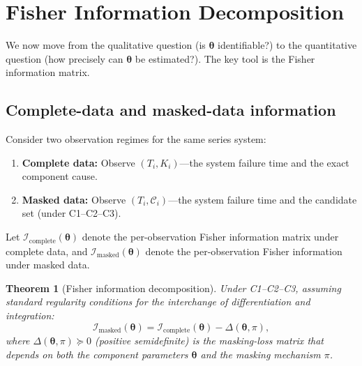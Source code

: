 \documentclass[11pt]{article}
\theoremstyle{definition}
\theoremstyle{plain}
\newtheorem{theorem}{Theorem}
\renewcommand{\v}[1]{\boldsymbol{#1}}
\newcommand{\btheta}{\v{\theta}}
\newcommand{\FI}{\mathcal{I}}       %
\begin{document}

\section{Fisher Information Decomposition}
\label{sec:fi-decomposition}

We now move from the qualitative question (is $\btheta$ identifiable?)
to the quantitative question (how precisely can $\btheta$ be estimated?).
The key tool is the Fisher information matrix.

\subsection{Complete-data and masked-data information}

Consider two observation regimes for the same series system:
\begin{enumerate}[nosep]
    \item \textbf{Complete data:} Observe $(T_i, K_i)$---the system
    failure time and the exact component cause.
    \item \textbf{Masked data:} Observe $(T_i, \mathcal{C}_i)$---the
    system failure time and the candidate set (under C1--C2--C3).
\end{enumerate}

Let $\FI_{\mathrm{complete}}(\btheta)$ denote the per-observation
Fisher information matrix under complete data, and
$\FI_{\mathrm{masked}}(\btheta)$ denote the per-observation Fisher
information under masked data.

\begin{theorem}[Fisher information decomposition]
\label{thm:fi-decomposition}
Under C1--C2--C3, assuming standard regularity conditions for the
interchange of differentiation and integration:
\begin{equation}
\label{eq:fi-decomposition}
    \FI_{\mathrm{masked}}(\btheta)
    = \FI_{\mathrm{complete}}(\btheta) - \Delta(\btheta, \pi),
\end{equation}
where $\Delta(\btheta, \pi) \succeq 0$ (positive semidefinite) is
the \emph{masking-loss matrix} that depends on both the component
parameters $\btheta$ and the masking mechanism $\pi$.
\end{theorem}
\end{document}

